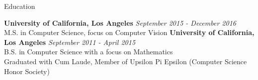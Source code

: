 \documentclass{resume} %
\begin{document}

\begin{rSection}{Education}

{\bf University of California, Los Angeles} \hfill {\em September 2015 - December 2016} \\ 
M.S. in Computer Science, focus on Computer Vision
\newline
{\bf University of California, Los Angeles} \hfill {\em September 2011 - April 2015} \\
B.S. in Computer Science with a focus on Mathematics \\
Graduated with Cum Laude, Member of Upsilon Pi Epsilon (Computer Science Honor Society)
\end{rSection}

\end{document}
